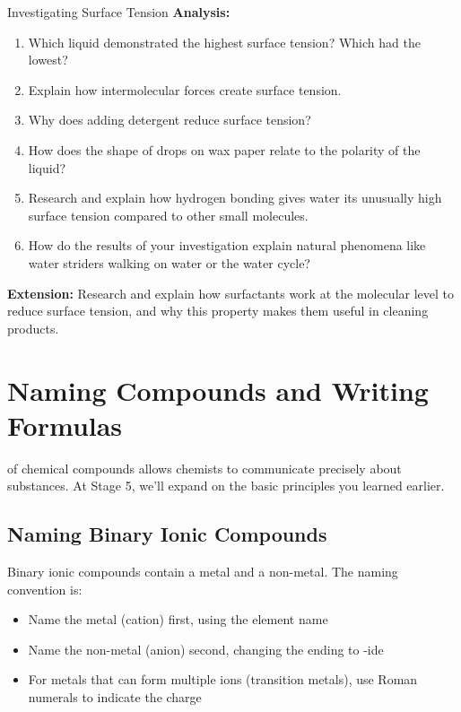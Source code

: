 \begin{investigation}{Investigating Surface Tension}
\textbf{Analysis:}
\begin{enumerate}
    \item Which liquid demonstrated the highest surface tension? Which had the lowest?
    
    \item Explain how intermolecular forces create surface tension.
    
    \item Why does adding detergent reduce surface tension?
    
    \item How does the shape of drops on wax paper relate to the polarity of the liquid?
    
    \item Research and explain how hydrogen bonding gives water its unusually high surface tension compared to other small molecules.
    
    \item How do the results of your investigation explain natural phenomena like water striders walking on water or the water cycle?
\end{enumerate}

\textbf{Extension:} Research and explain how surfactants work at the molecular level to reduce surface tension, and why this property makes them useful in cleaning products.
\end{investigation}

\section{Naming Compounds and Writing Formulas}

 of chemical compounds allows chemists to communicate precisely about substances. At Stage 5, we'll expand on the basic principles you learned earlier.

\subsection{Naming Binary Ionic Compounds}

Binary ionic compounds contain a metal and a non-metal. The naming convention is:
\begin{itemize}
    \item Name the metal (cation) first, using the element name
    \item Name the non-metal (anion) second, changing the ending to -ide
    \item For metals that can form multiple ions (transition metals), use Roman numerals to indicate the charge
\end{itemize}

